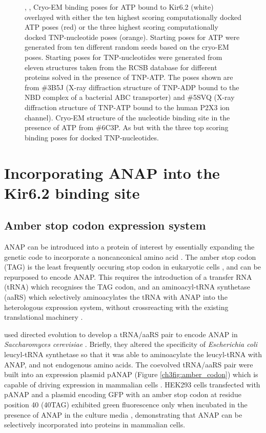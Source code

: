 \begin{figure}[h]
	\caption[TNP-nucleotides can bind with a similar pose to ATP]{
	, ,  Cryo-EM binding poses for ATP bound to Kir6.2 (white) overlayed with either the ten highest scoring computationally docked ATP poses (red) or the three highest scoring computationally docked TNP-nucleotide poses (orange).
	Starting poses for ATP were generated from ten different random seeds based on the cryo-EM poses.
	Starting poses for TNP-nucleotides were generated from eleven structures taken from the RCSB database for different proteins solved in the presence of TNP-ATP.
	The poses shown are from \#3B5J (X-ray diffraction structure of TNP-ADP bound to the NBD complex of a bacterial ABC transporter) and \#5SVQ (X-ray diffraction structure of TNP-ATP bound to the human P2X3 ion channel).
	 Cryo-EM structure of the nucleotide binding site in the presence of ATP from \#6C3P.
	 As  but with the three top scoring binding poses for docked TNP-nucleotides.
	}\label{ch3fig:docking}
\end{figure}

\section{Incorporating ANAP into the Kir6.2 binding site}

\subsection{Amber stop codon expression system}

ANAP can be introduced into a protein of interest by essentially expanding the genetic code to incorporate a noncanconical amino acid \cite{chin_expanding_2017}.
The amber stop codon (TAG) is the least frequently occuring stop codon in eukaryotic cells \cite{cridge_eukaryotic_2018}, and can be repurposed to encode ANAP.
This requires the introduction of a transfer RNA (tRNA) which recognises the TAG codon, and an aminoacyl-tRNA synthetase (aaRS) which selectively aminoacylates the tRNA with ANAP into the heterologous expression system, without crossreacting with the existing translational machinery \cite{lee_genetic_2009, chatterjee_genetically_2013}.

\citeauthor{lee_genetic_2009} used directed evolution to develop a tRNA/aaRS pair to encode ANAP in \textit{Saccharomyces cerevisiae} \cite{lee_genetic_2009}.
Briefly, they altered the specificity of \textit{Escherichia coli} leucyl-tRNA synthetase so that it was able to aminoacylate the leucyl-tRNA with ANAP, and not endogenous amino acids.
The coevolved tRNA/aaRS pair were built into an expression plasmid pANAP (Figure \ref{ch3fig:amber_codon}) which is capable of driving expression in mammalian cells \cite{chatterjee_genetically_2013}.
HEK293 cells transfected with pANAP and a plasmid encoding GFP with an amber stop codon at residue position 40 (40TAG) exhibited green fluorescence only when incubated in the presence of ANAP in the culture media \cite{chatterjee_genetically_2013}, demonstrating that ANAP can be selectively incorporated into proteins in mammalian cells.

